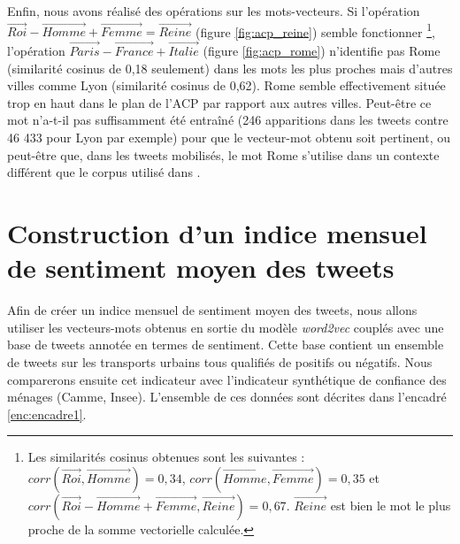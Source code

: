 \documentclass[11pt,french,french]{article}
\let\rmarkdownfootnote\footnote%
\def\footnote{\protect\rmarkdownfootnote}
\begin{document}
Enfin, nous avons réalisé des opérations sur les mots-vecteurs. Si
l'opération
\(\overrightarrow{Roi} - \overrightarrow{Homme} + \overrightarrow{Femme} = \overrightarrow{Reine}\)
(figure \ref{fig:acp_reine}) semble fonctionner \footnote{Les
  similarités cosinus obtenues sont les suivantes :
  \(corr(\overrightarrow{Roi}, \overrightarrow{Homme}) = 0,34\),
  \(corr(\overrightarrow{Homme}, \overrightarrow{Femme}) = 0,35\) et
  \(corr(\overrightarrow{Roi} - \overrightarrow{Homme} + \overrightarrow{Femme} , \overrightarrow{Reine}) = 0,67\).
  \(\overrightarrow{Reine}\) est bien le mot le plus proche de la somme
  vectorielle calculée.}, l'opération
\(\overrightarrow{Paris} - \overrightarrow{France} + \overrightarrow{Italie}\)
(figure \ref{fig:acp_rome}) n'identifie pas \og Rome \fg{} (similarité
cosinus de 0,18 seulement) dans les mots les plus proches mais d'autres
villes comme \og Lyon \fg{} (similarité cosinus de 0,62). \og Rome \fg{}
semble effectivement située \og trop en haut\fg{} dans le plan de l'ACP
par rapport aux autres villes. Peut-être ce mot n'a-t-il pas
suffisamment été entraîné (246 apparitions dans les tweets contre 46 433
pour Lyon par exemple) pour que le vecteur-mot obtenu soit pertinent, ou
peut-être que, dans les tweets mobilisés, le mot \og Rome \fg{}
s'utilise dans un contexte différent que le corpus utilisé dans
\cite{Mikolov}.

\section{Construction d'un indice mensuel de sentiment moyen des
tweets}\label{sec:sentimentalAnalysis}

Afin de créer un indice mensuel de sentiment moyen des tweets, nous
allons utiliser les vecteurs-mots obtenus en sortie du modèle
\emph{word2vec} couplés avec une base de tweets annotée en termes de
sentiment. Cette base contient un ensemble de tweets sur les transports
urbains tous qualifiés de positifs ou négatifs. Nous comparerons ensuite
cet indicateur avec l'indicateur synthétique de confiance des ménages
(Camme, Insee). L'ensemble de ces données sont décrites dans l'encadré
\ref{enc:encadre1}.
\end{document}
